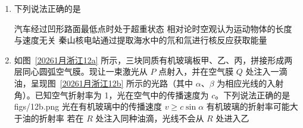 \documentclass[\gkver]{gaokaozhenti}
\begin{document}
\begin{enumerate}
{在 $0\sim2t_{0}$ 内，通过线圈 A 的电荷量 $q = \frac{\Delta\Phi_{\mathrm{A}}}{R} = \frac{\pi r_{2}^{2}aI_{0}}{R}$，C 错误；

D．在 $0\sim5t_{0}$ 内，线圈 A 产生焦耳热只有在电流变化的区间才产生感应电动势和焦耳热，即 $t_{0}\sim3t_{0}$ 和 $4t_{0}\sim5t_{0}$ 时间段。$t_{0}\sim3t_{0}$ 时长为 $2t_{0}$，线圈 A 的感应电动势 $E_{1}=nS\frac{\Delta B}{\Delta t}=\frac{\pi r_{2}^{2}aI_{0}}{t_{0}}$

产生的焦耳热 $Q_{1}=\frac{E_{1}^{2}}{R}\cdot2t_{0}=2\frac{\left(\pi r_{2}^{2}aI_{0}\right)^{2}}{Rt_{0}}$

在 $4t_{0}\sim5t_{0}$ 时间段内，感应电动势 $E_{2}=nS\frac{\Delta B}{\Delta t}=\frac{\pi r_{2}^{2}aI_{0}}{t_{0}}$

产生的焦耳热 $Q_{2}=\frac{E_{2}^{2}}{R}t_{0}=\frac{\left(\pi r_{2}^{2}aI_{0}\right)^{2}}{Rt_{0}}$

在 $0\sim5t_{0}$ 内，线圈 A 产生的焦耳热 $Q = Q_{1} + Q_{2} = \frac{3(\pi r_{2}^{2}aI_{0})^{2}}{Rt_{0}}$，D 正确。

故选 D。
}

\item
下列说法正确的是 

{汽车经过凹形路面最低点时处于超重状态}
{相对论时空观认为运动物体的长度与速度无关}
{秦山核电站通过提取海水中的氘和氚进行核反应获取能量}


\item
如图~\ref{20261月浙江12a} 所示，三块同质有机玻璃板甲、乙、丙，拼接形成两层同心圆弧空气膜。现让一束激光从 $P$ 点射入，并在空气膜 $Q$ 处注入一滴油，呈现图~\ref{20261月浙江12b} 所示的光路（其中 $\alpha$、$\beta$ 为相应光线的入射角）。已知空气折射率为 1，光在空气中的传播速度为 $c$。下列说法正确的是 
{figs/12b.png}
{光在有机玻璃中的传播速度 $v \geq c\sin\alpha$}
{有机玻璃的折射率可能大于油的折射率}
{若在 $R$ 处注入同种油滴，光线不会从 $R$ 处进入乙}


\end{enumerate}
\end{document}
